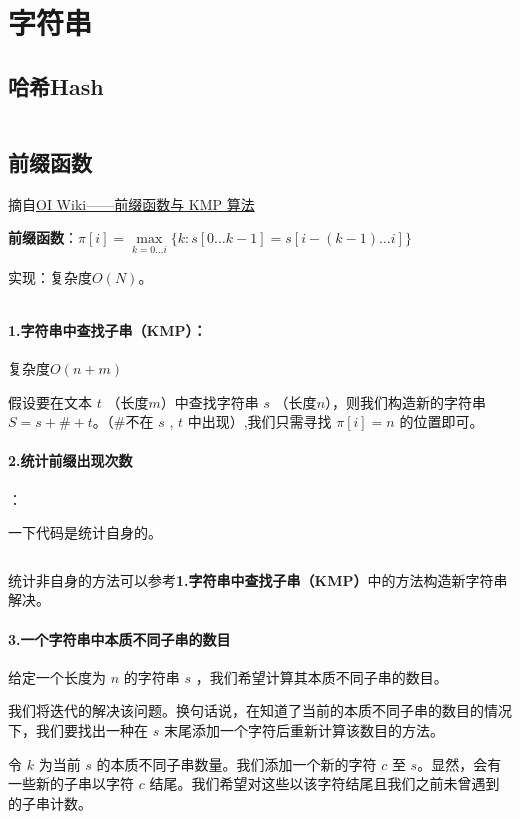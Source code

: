 \documentclass[a4paper,11pt]{article}
\begin{document}
\newpage
\section{字符串}
\subsection{哈希Hash}
\inputminted[linenos]{c++}{string/hash.cpp}
\subsection{前缀函数}
摘自\href{https://oi-wiki.org/string/kmp/}{OI Wiki------前缀函数与 KMP
算法}

\textbf{前缀函数}：\(\pi [i]=\max\limits_{k=0\ldots i}\lbrace k:s[0\ldots k-1]=s[i-(k-1)\ldots i]\rbrace\)

实现：复杂度\(O(N)\)。
\inputminted[linenos]{c++}{string/prefixfunction1.cpp}

\paragraph{1.字符串中查找子串（KMP）：}复杂度\(O(n+m)\)

假设要在文本 \(t\) （长度\(m\)）中查找字符串 \(s\)
（长度\(n\)），则我们构造新的字符串 \(S=s+\#+t\)。（\#不在 \(s\) , \(t\)
中出现）,我们只需寻找 \(\pi[i]=n\) 的位置即可。

\paragraph{2.统计前缀出现次数}：

一下代码是统计自身的。
\inputminted[linenos]{c++}{string/prefixfunction2.cpp}
统计非自身的方法可以参考\textbf{1.字符串中查找子串（KMP）}中的方法构造新字符串解决。
\paragraph{3.一个字符串中本质不同子串的数目} 

给定一个长度为 \(n\) 的字符串 \(s\) ，我们希望计算其本质不同子串的数目。

我们将迭代的解决该问题。换句话说，在知道了当前的本质不同子串的数目的情况下，我们要找出一种在
\(s\) 末尾添加一个字符后重新计算该数目的方法。

令 \(k\) 为当前 \(s\) 的本质不同子串数量。我们添加一个新的字符 \(c\) 至
\(s\)。显然，会有一些新的子串以字符 \(c\)
结尾。我们希望对这些以该字符结尾且我们之前未曾遇到的子串计数。
\end{document}
